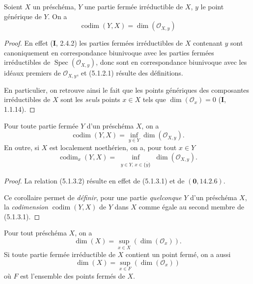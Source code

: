 \begin{proposition}[5.1.2]
\label{IV.2.5.1.2-fr}
Soient $X$ un préschéma, $Y$ une partie fermée irréductible de $X$, $y$ le
point générique de $Y$. On a
\begin{equation}
\operatorname{codim}(Y,X)=\dim(\mathcal O_{X,y})
\tag{5.1.2.1}\label{IV.2.5.1.2.1-fr}
\end{equation}
\end{proposition}

\begin{proof}
En effet (\textbf{I}, 2.4.2) les parties fermées irréductibles de $X$ contenant $y$
sont canoniquement en correspondance biunivoque avec les parties fermées
irréductibles de $\operatorname{Spec}(\mathcal O_{X,y})$, donc sont en
correspondance biunivoque avec les idéaux premiers de $\mathcal O_{X,y}$, et
(5.1.2.1) résulte des définitions.

En particulier, on retrouve ainsi le fait que les points génériques des
composantes irréductibles de $X$ sont les \emph{seuls} points $x\in X$ tels
que $\dim(\mathcal O_x)=0$ (\textbf{I}, 1.1.14).
\end{proof}


\begin{corollary}[5.1.3]
\label{IV.2.5.1.3-fr}
Pour toute partie fermée $Y$ d'un préschéma $X$, on a
\begin{equation}
\operatorname{codim}(Y,X)=\inf_{y\in Y}\dim(\mathcal O_{X,y}).
\tag{5.1.3.1}\label{IV.2.5.1.3.1-fr}
\end{equation}
En outre, si $X$ est localement noethérien, on a, pour tout $x\in Y$
\begin{equation}
\operatorname{codim}_x(Y,X)=
\inf_{\substack{y\in Y,\,x\in\overline{\{y\}}}}
\dim(\mathcal O_{X,y}).
\tag{5.1.3.2}\label{IV.2.5.1.3.2-fr}
\end{equation}
\end{corollary}

\begin{proof}
La relation (5.1.3.2) résulte en effet de (5.1.3.1) et de $(\mathbf{0},14.2.6)$.

Ce corollaire permet de \emph{définir}, pour une partie \emph{quelconque}
$Y$ d'un préschéma $X$, la \emph{codimension} $\operatorname{codim}(Y,X)$ de
$Y$ dans $X$ comme égale au second membre de (5.1.3.1).
\end{proof}

\begin{proposition}[5.1.4]
\label{IV.2.5.1.4-fr}
Pour tout préschéma $X$, on a
\begin{equation}
\dim(X)=\sup_{x\in X}(\dim(\mathcal O_x)).
\tag{5.1.4.1}\label{IV.2.5.1.4.1-fr}
\end{equation}
Si toute partie fermée irréductible de $X$ contient un point fermé, on a aussi
\begin{equation}
\dim(X)=\sup_{x\in F}(\dim(\mathcal O_x))
\tag{5.1.4.2}\label{IV.2.5.1.4.2-fr}
\end{equation}
où $F$ est l'ensemble des points fermés de $X$.
\end{proposition}

